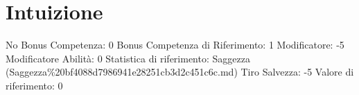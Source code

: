 \section{Intuizione}\label{intuizione}

\begin{description}
\tightlist
\item[Tags: ABI]
No Bonus Competenza: 0 Bonus Competenza di Riferimento: 1 Modificatore:
-5 Modificatore Abilità: 0 Statistica di riferimento: Saggezza
(Saggezza\%20bf4088d7986941e28251cb3d2c451c6c.md) Tiro Salvezza: -5
Valore di riferimento: 0
\end{description}
